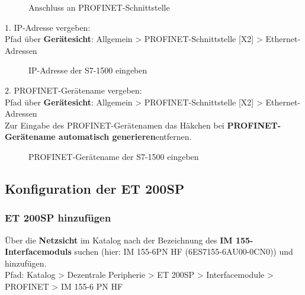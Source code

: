 \begin{figure}[H]
   \centering
   \caption[Anschluss an PROFINET-Schnittstelle]{Anschluss an PROFINET-Schnittstelle}
   \label{fig:Bild3.11}
\end{figure}

1. IP-Adresse vergeben:\\
Pfad über \textbf{Gerätesicht}: Allgemein > PROFINET-Schnittstelle [X2] > Ethernet-Adressen
\begin{figure}[H]
   \centering
   \caption[IP-Adresse der S7-1500 eingeben]{IP-Adresse der S7-1500 eingeben}
   \label{fig:Bild3.12}
\end{figure}

\clearpage

2. PROFINET-Gerätename vergeben:\\
Pfad über \textbf{Gerätesicht}: Allgemein > PROFINET-Schnittstelle [X2] > Ethernet-Adressen\\
\newline
Zur Eingabe des PROFINET-Gerätenamen das Häkchen bei \glqq\textbf{PROFINET-Gerätename automatisch generieren}\grqq\:entfernen.

\begin{figure}[H]
   \centering
   \caption[PROFINET-Gerätename der S7-1500 eingeben]{PROFINET-Gerätename der S7-1500 eingeben}
   \label{fig:Bild3.13}
\end{figure}

\subsection{Konfiguration der ET 200SP} \label{sec:Konfiguration_der_ET_200_SP}

\subsubsection{ET 200SP hinzufügen}
Über die \textbf{Netzsicht} im Katalog nach der Bezeichnung des \textbf{IM 155-Interfacemoduls} suchen (hier: IM 155-6PN HF (6ES7155-6AU00-0CN0)) und hinzufügen.\\
Pfad: Katalog > Dezentrale Peripherie > ET 200SP > Interfacemodule > PROFINET > IM 155-6 PN HF


